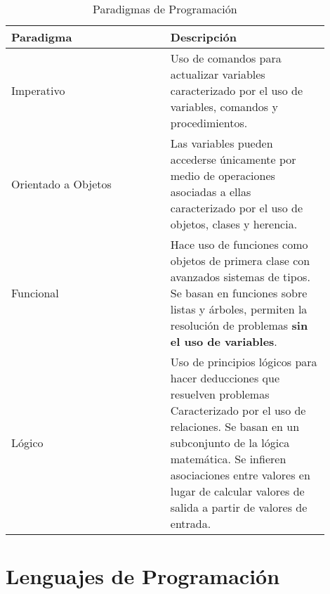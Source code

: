 \documentclass{report}
\theoremstyle{mytheoremstyle}
\theoremstyle{mytheoremstyle}
\theoremstyle{myproblemstyle}
\begin{document}
    \begin{table}[H]
        \centering
        \begin{tabular}{|m{0.45\linewidth}|m{0.45\linewidth}|}
            \hline
            Paradigma & Descripción\\\hline
            Imperativo & Uso de comandos para actualizar variables caracterizado por el uso de variables, comandos y procedimientos.\\\hline
            Orientado a Objetos & Las variables pueden accederse únicamente por medio de operaciones asociadas a ellas caracterizado por el uso de objetos, clases y herencia.\\\hline
            Funcional & Hace uso de funciones como objetos de primera clase con avanzados sistemas de tipos. Se basan en funciones sobre listas y árboles, permiten la resolución de problemas \textbf{sin el uso de variables}.\\\hline 
            Lógico & Uso de principios lógicos para hacer deducciones que resuelven problemas Caracterizado por el uso de relaciones. Se basan en un subconjunto de la lógica matemática. Se infieren asociaciones entre valores en lugar de calcular valores de salida a partir de valores de entrada.\\\hline
        \end{tabular}
        \caption{Paradigmas de Programación}

        
    \end{table}
    
    \section*{Lenguajes de Programación}
    
\end{document}
